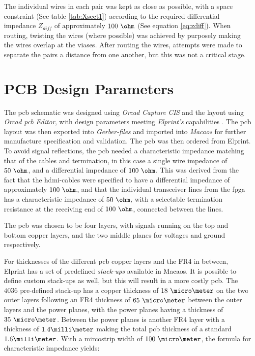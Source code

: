 \documentclass[main.tex]{subfiles}
\begin{document}
The individual wires in each pair was kept as close as possible, with a space constraint (See table \ref{tab:Xsect1}) according to the required differential impedance $Z_{diff}$ of approximately $100\ \ohm$ (See equation \ref{eq:zdiff}). When routing, twisting the wires (where possible) was achieved by purposely making the wires overlap at the viases. After routing the wires, attempts were made to separate the pairs a distance from one another, but this was not a critical stage.

\section{PCB Design Parameters}

The \gls{pcb} schematic was designed using \textit{Orcad Capture CIS} and the layout using \textit{Orcad \gls{pcb} Editor}, with design parameters meeting \textit{Elprint's} capabilities \cite{elprint15}. The \gls{pcb} layout was then exported into \textit{Gerber-files} and imported into \textit{Macaos} for further manufacture specification and validation. The \gls{pcb} was then ordered from Elprint. \\%

To avoid signal reflections, the \gls{pcb} needed a characteristic impedance matching that of the cables and termination, in this case a single wire impedance of $50\ \ohm$, and a differential impedance of $100\ \ohm$. This was derived from the fact that the \gls{hdmi}-cables were specified to have a differential impedance of approximately $100\ \ohm$, and that the individual transceiver lines from the \gls{fpga} has a characteristic impedance of $50\ \ohm$, with a selectable termination resistance at the receiving end of $100\ \ohm$, connected between the lines.

The \gls{pcb} was chosen to be four layers, with signals running on the top and bottom copper layers, and the two middle planes for voltages and ground respectively.

For thicknesses of the different \gls{pcb} copper layers and the FR4 in between, Elprint has a set of predefined \textit{stack-ups} available in Macaos. It is possible to define custom stack-ups as well, but this will result in a more costly \gls{pcb}. The $4036$ pre-defined stack-up has a copper thickness of $18\ \micro\meter$ on the two outer layers following an FR4 thickness of $65\ \micro\meter$ between the outer layers and the power planes, with the power planes having a thickness of $35\ \micro\meter$. Between the power planes is another FR4 layer with a thickness of $1.4 \milli\meter$ making the total \gls{pcb} thickness of a standard $1.6 \milli\meter$. With a mircostrip width of $100\ \micro\meter$, the formula for characteristic impedance yields:
\end{document}
